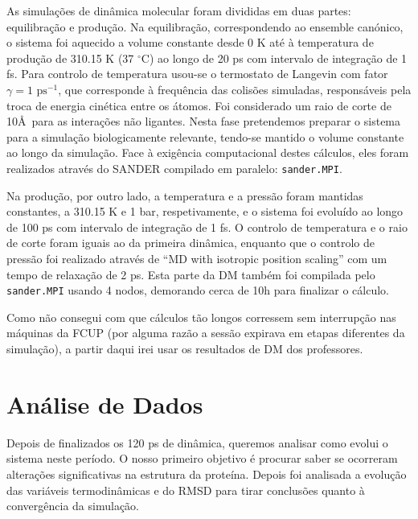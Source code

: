 \documentclass[12pt,a4paper]{article}
\begin{document}
	As simulações de dinâmica molecular foram divididas em duas partes: equilibração e produção. Na equilibração, correspondendo ao ensemble canónico, o sistema foi aquecido a volume constante desde 0 K até à temperatura de produção de 310.15 K (37 $^\circ$C) ao longo de 20 ps com intervalo de integração de 1 fs. Para controlo de temperatura usou-se o termostato de Langevin com fator $\gamma = 1 \textrm{ ps}^{-1}$, que corresponde à frequência das colisões simuladas, responsáveis pela troca de energia cinética entre os átomos. Foi considerado um raio de corte de 10\AA \ para as interações não ligantes. Nesta fase pretendemos preparar o sistema para a simulação biologicamente relevante, tendo-se mantido o volume constante ao longo da simulação. Face à exigência computacional destes cálculos, eles foram realizados através do SANDER compilado em paralelo: \verb|sander.MPI|.
	
	Na produção, por outro lado, a temperatura e a pressão foram mantidas constantes, a 310.15 K e 1 bar, respetivamente, e o sistema foi evoluído ao longo de 100 ps com intervalo de integração de 1 fs. O controlo de temperatura e o raio de corte foram iguais ao da primeira dinâmica, enquanto que o controlo de pressão foi realizado através de ``MD with isotropic position scaling'' com um tempo de relaxação de 2 ps. Esta parte da DM também foi compilada pelo \verb|sander.MPI| usando 4 nodos, demorando cerca de 10h para finalizar o cálculo.
	
	Como não consegui com que cálculos tão longos corressem sem interrupção nas máquinas da FCUP (por alguma razão a sessão expirava em etapas diferentes da simulação), a partir daqui irei usar os resultados de DM dos professores.
	
\section{Análise de Dados}
	Depois de finalizados os 120 ps de dinâmica, queremos analisar como evolui o sistema neste período. O nosso primeiro objetivo é procurar saber se ocorreram alterações significativas na estrutura da proteína. Depois foi analisada a evolução das variáveis termodinâmicas e do RMSD para tirar conclusões quanto à convergência da simulação.
	
\end{document}
